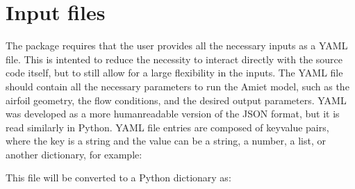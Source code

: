 \documentclass[letterpaper,10pt,english]{sphinxmanual}
\begin{document}
\section{Input files}
\label{\detokenize{usage:input-files}}\label{\detokenize{usage:target-to-input-files}}
\sphinxAtStartPar
The  package requires that the user provides all the necessary inputs as a YAML file. This is intented to reduce the necessity to interact directly with the source code itself, but to still allow for a large flexibility in the inputs. The YAML file should contain all the necessary parameters to run the Amiet model, such as the airfoil geometry, the flow conditions, and the desired output parameters.  YAML was developed as a more human\sphinxhyphen{}readable version of the JSON format, but it is read similarly in Python. YAML file entries are composed of key\sphinxhyphen{}value pairs, where the key is a string and the value can be a string, a number, a list, or another dictionary, for example:
\def\sphinxLiteralBlockLabel{\label{\detokenize{usage:id1}}}
\begin{sphinxVerbatim}[commandchars=\\\{\}]
\end{sphinxVerbatim}

\sphinxAtStartPar
This file will be converted to a Python dictionary as:

\begin{sphinxVerbatim}[commandchars=\\\{\}]
  
     
     
     
\end{sphinxVerbatim}
\end{document}
